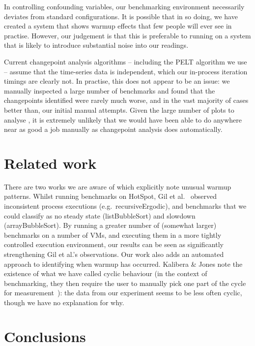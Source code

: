 \documentclass[acmlarge]{acmart}\settopmatter{printfolios=true}
\newcommand{\kalibera}{Kalibera \& Jones\xspace}
\begin{document}
In controlling confounding variables, our benchmarking environment necessarily
deviates from standard configurations. It is possible that in so doing, we have
created a system that shows warmup effects that few people will ever see in
practise. However, our judgement is that this is preferable to running on a
system that is likely to introduce substantial noise into our readings.

Current changepoint analysis algorithms -- including the PELT algorithm we use
-- assume that the time-series data is independent, which our in-process
iteration timings are clearly not. In practise, this does not appear to be an
issue: we manually inspected a large number of benchmarks and found that the
changepoints identified were rarely much worse, and in the vast majority of
cases better than, our initial manual attempts. Given the large number of
plots to analyse , it is extremely unlikely that
we would have been able to do anywhere near as good a job manually as
changepoint analysis does automatically.


\section{Related work}

There are two works we are aware of which explicitly note unusual warmup
patterns. Whilst running benchmarks on HotSpot, Gil et
al.~\cite{gil11microbenchmark} observed inconsistent process executions
(e.g.~recursiveErgodic), and benchmarks that we could classify as no
steady state (listBubbleSort) and slowdown (arrayBubbleSort). By running a
greater number of (somewhat larger) benchmarks on a number of VMs, and executing
them in a more tightly controlled execution environment, our results can be seen
as significantly strengthening Gil et al.'s observations. Our work also adds an
automated approach to identifying when warmup has occurred.
\kalibera note the
existence of what we have called cyclic behaviour (in the context of benchmarking,
they then require the user to
manually pick one part of the cycle for measurement~\cite{kalibera13rigorous}):
the data from our experiment seems to be less often cyclic, though we have no
explanation for why.


\section{Conclusions}
\label{sec:conclusion}
\end{document}
